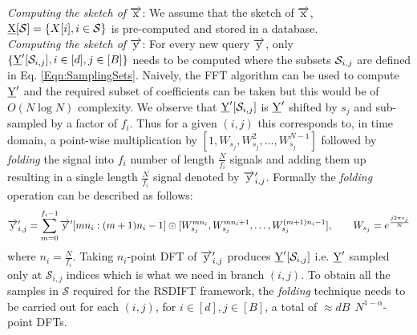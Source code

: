 \begin{enumerate}
\textit{Computing the sketch of $\overrightarrow{\mathrm{x}}$}: We assume that the sketch of $\overrightarrow{\mathrm{x}}$, $ \underline{\mathrm{X}}[\mathcal{S}]= \{X[i],i\in \mathcal{S}\}$ is pre-computed and stored in a database.  \\

\textit{Computing the sketch of $\overrightarrow{\mathrm{y}}$}: For every new query $\overrightarrow{\mathrm{y}}$, only $\{\underline{\mathrm{Y}}'[\mathcal{S}_{i,j}],i\in[d],j\in[B]\}$ needs to be computed where the subsets $\mathcal{S}_{i,j}$ are defined in Eq. \eqref{Eqn:SamplingSets}. Naively, the FFT algorithm can be used to compute $\underline{\mathrm{Y}}'$ and the required subset of coefficients can be taken but this would be of $O(N \log N)$ complexity. We observe that $\underline{\mathrm{Y}}'[\mathcal{S}_{i,j}]$ is $\underline{\mathrm{Y}}'$ shifted by $s_j$ and sub-sampled by a factor of $f_i$. Thus for a given $(i,j)$ this corresponds to, in time domain, a point-wise multiplication by $[1,W_{s_j},W_{s_j}^2,\ldots,W_{s_j}^{N-1}]$ followed by \textit{folding} the signal into $f_i$ number of length $\frac{N}{f_i}$ signals and adding them up resulting in a single length $\frac{N}{f_i}$ signal denoted by $\overrightarrow{\mathrm{y}}'_{i,j}$. Formally the \textit{folding} operation can be described as follows:
	  \begin{equation}
	  	\overrightarrow{\mathrm{y}}'_{i,j} = \sum \limits_{m = 0}^{f_i-1} \overrightarrow{\mathrm{y}}'[mn_i:(m+1)n_i-1] \odot [W_{s_j}^{mn_i},W_{s_j}^{mn_i+1},\ldots, W_{s_j}^{(m+1)n_i-1}],\qquad W_{s_j}=e^{\frac{j2\pi s_j}{N}}
	  \end{equation}
	  where $n_i=\frac{N}{f_i}$. Taking $n_i$-point DFT of $\overrightarrow{\mathrm{y}}'_{i,j}$ produces $\underline{\mathrm{Y}}'[\mathcal{S}_{i,j}]$ i.e. $\underline{\mathrm{Y}}'$ sampled only at $\mathcal{S}_{i,j}$ indices which is what we need in branch $(i,j)$. To obtain all the samples in $\mathcal{S}$ required for the RSDIFT framework, the \textit{folding} technique needs to be carried out for each $(i,j)$, for $i\in[d],j\in[B]$, a total of $\approx dB~~ N^{1-\alpha}$-point DFTs.
\end{enumerate}

